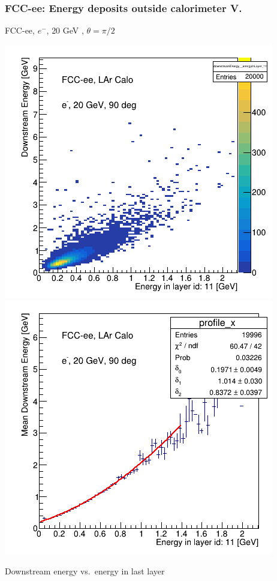 \documentclass[aspectratio=169]{beamer}
\newcommand{\redtext}[1]{%
  \textcolor{myRed}{#1}
}
\begin{document}
\begin{frame}
  \frametitle{FCC-ee: Energy deposits outside calorimeter V.}

  \centering
  FCC-ee, $e^{-}$, \redtext{20 GeV}, $\theta = \pi/2$ \\[1.5ex]
  \begin{adjustwidth}{-9mm}{-9mm}
    \includegraphics[width=0.49\linewidth]{figures/12layers/hist_downstream_vs_layer_11_90deg_20GeV.png}
    \includegraphics[width=0.49\linewidth]{figures/12layers/profile_downstream_vs_layer_11_90deg_20GeV.png}
  \end{adjustwidth}
  \redtext{Downstream} energy vs.\ energy in last layer
\end{frame}
\end{document}
